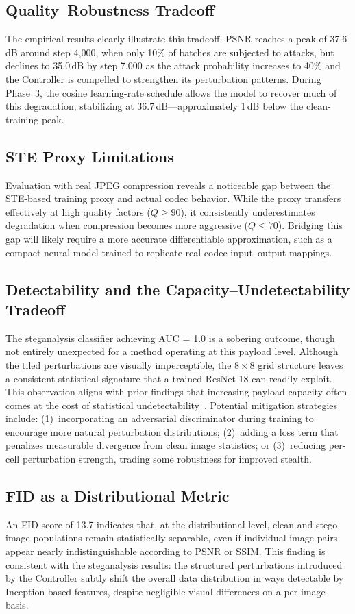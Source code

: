 \documentclass[conference]{IEEEtran}
\begin{document}
\subsection{Quality--Robustness Tradeoff}
The empirical results clearly illustrate this tradeoff.
PSNR reaches a peak of 37.6\,dB around step 4{,}000, when only 10\% of batches are subjected to attacks, but declines to 35.0\,dB by step 7{,}000 as the attack probability increases to 40\% and the Controller is compelled to strengthen its perturbation patterns.
During Phase~3, the cosine learning-rate schedule allows the model to recover much of this degradation, stabilizing at 36.7\,dB---approximately 1\,dB below the clean-training peak.

\subsection{STE Proxy Limitations}
Evaluation with real JPEG compression reveals a noticeable gap between the STE-based training proxy and actual codec behavior.
While the proxy transfers effectively at high quality factors ($Q \geq 90$), it consistently underestimates degradation when compression becomes more aggressive ($Q \leq 70$).
Bridging this gap will likely require a more accurate differentiable approximation, such as a compact neural model trained to replicate real codec input--output mappings.

\subsection{Detectability and the Capacity--Undetectability Tradeoff}
The steganalysis classifier achieving AUC = 1.0 is a sobering outcome, though not entirely unexpected for a method operating at this payload level.
Although the tiled perturbations are visually imperceptible, the $8 \times 8$ grid structure leaves a consistent statistical signature that a trained ResNet-18 can readily exploit.
This observation aligns with prior findings that increasing payload capacity often comes at the cost of statistical undetectability~\cite{boroumand2019deep}.
Potential mitigation strategies include: (1)~incorporating an adversarial discriminator during training to encourage more natural perturbation distributions; (2)~adding a loss term that penalizes measurable divergence from clean image statistics; or (3)~reducing per-cell perturbation strength, trading some robustness for improved stealth.

\subsection{FID as a Distributional Metric}
An FID score of 13.7 indicates that, at the distributional level, clean and stego image populations remain statistically separable, even if individual image pairs appear nearly indistinguishable according to PSNR or SSIM.
This finding is consistent with the steganalysis results: the structured perturbations introduced by the Controller subtly shift the overall data distribution in ways detectable by Inception-based features, despite negligible visual differences on a per-image basis.
\end{document}
